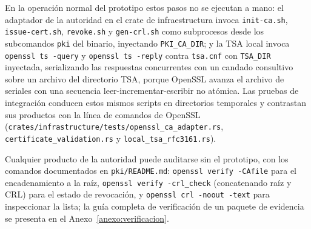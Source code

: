 En la operación normal del prototipo estos pasos no se ejecutan a mano: el adaptador de la autoridad en el crate de infraestructura invoca \texttt{init-ca.sh}, \texttt{issue-cert.sh}, \texttt{revoke.sh} y \texttt{gen-crl.sh} como subprocesos desde los subcomandos \texttt{pki} del binario, inyectando \texttt{PKI\_CA\_DIR}; y la TSA local invoca \texttt{openssl ts -query} y \texttt{openssl ts -reply} contra \texttt{tsa.cnf} con \texttt{TSA\_DIR} inyectada, serializando las respuestas concurrentes con un candado consultivo sobre un archivo del directorio TSA, porque OpenSSL avanza el archivo de seriales con una secuencia leer-incrementar-escribir no atómica. Las pruebas de integración conducen estos mismos scripts en directorios temporales y contrastan sus productos con la línea de comandos de OpenSSL (\texttt{crates/infrastructure/tests/\allowbreak openssl\_ca\_adapter.rs}, \texttt{certificate\_validation.rs} y \texttt{local\_tsa\_rfc3161.rs}).

Cualquier producto de la autoridad puede auditarse sin el prototipo, con los comandos documentados en \texttt{pki/README.md}: \texttt{openssl verify -CAfile} para el encadenamiento a la raíz, \texttt{openssl verify -crl\_check} (concatenando raíz y CRL) para el estado de revocación, y \texttt{openssl crl -noout -text} para inspeccionar la lista; la guía completa de verificación de un paquete de evidencia se presenta en el Anexo~\ref{anexo:verificacion}.
